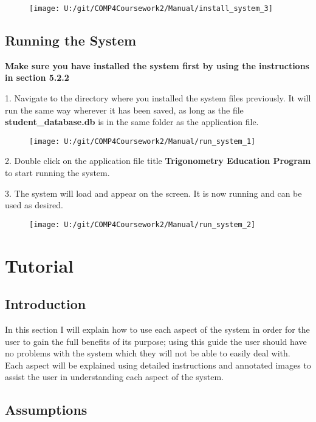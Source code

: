 \begin{figure}[H]
    \texttt{[image: U:/git/COMP4Coursework2/Manual/install\_system\_3]}
\end{figure}

\subsection{Running the System}

\textbf{Make sure you have installed the system first by using the instructions in section 5.2.2}

1. Navigate to the directory where you installed the system files previously. It will run the same way wherever it has been saved, as long as the file \textbf{student\_database.db} is in the same folder as the application file.

\begin{figure}[H]
    \texttt{[image: U:/git/COMP4Coursework2/Manual/run\_system\_1]}
\end{figure}

2. Double click on the application file title \textbf{Trigonometry Education Program} to start running the system.

3. The system will load and appear on the screen. It is now running and can be used as desired.

\begin{figure}[H]
    \texttt{[image: U:/git/COMP4Coursework2/Manual/run\_system\_2]}
\end{figure}

\section{Tutorial}

\subsection{Introduction}

In this section I will explain how to use each aspect of the system in order for the user to gain the full benefits of its purpose; using this guide the user should have no problems with the system which they will not be able to easily deal with. Each aspect will be explained using detailed instructions and annotated images to assist the user in understanding each aspect of the system.

\subsection{Assumptions}

